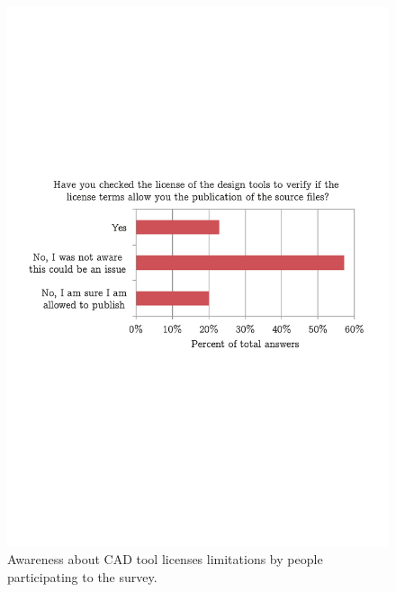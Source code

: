 \documentclass[letterpaper, 10 pt, conference]{ieeeconf}  %
\begin{document}
\begin{figure}
\centering
\includegraphics[width=\columnwidth]{figures/checklicense}
\caption{Awareness about CAD tool licenses limitations by people participating to the survey.}
\label{fig:aware}
\end{figure}
\end{document}
